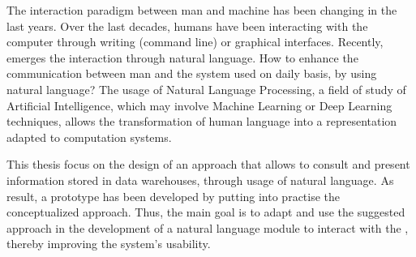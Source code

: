 \begin{abstractotherlanguage}
The interaction paradigm between man and machine has been changing in the last years. Over the last decades, humans have been interacting with the computer through writing (command line) or graphical interfaces. Recently, emerges the interaction through natural language. How to enhance the communication between man and the system used on daily basis, by using natural language? The usage of Natural Language Processing, a field of study of Artificial Intelligence, which may involve Machine Learning or Deep Learning techniques, allows the transformation of human language into a representation adapted to computation systems.

This thesis focus on the design of an approach that allows to consult and present information stored in data warehouses, through usage of natural language. As result, a prototype has been developed by putting into practise the conceptualized approach. Thus, the main goal is to adapt and use the suggested approach in the development of a natural language module to interact with the {\productname}, thereby improving the system's usability.

\end{abstractotherlanguage}